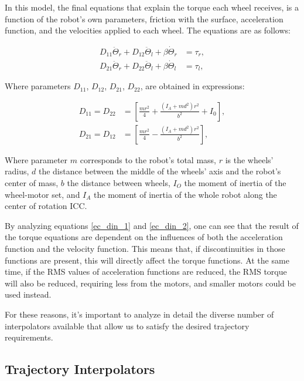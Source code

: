 \documentclass[a4paper]{aadeca}
\begin{document}
In this model, the final equations that explain the torque each wheel receives, is a function of the robot's own parameters, friction with the surface, acceleration function, and the velocities applied to each wheel.
The equations are as follows:

\begin{align}
D_{11}\ddot{\Theta}_r+D_{12}\ddot{\Theta}_l+\beta\dot{\Theta}_r&=\tau_r,
\label{ec_din_1}\\
D_{21}\ddot{\Theta}_r+D_{22}\ddot{\Theta}_l+\beta\dot{\Theta}_l&=\tau_l,
\label{ec_din_2}
\end{align}

Where parameters $D_{11}$, $D_{12}$, $D_{21}$, $D_{22}$, are obtained in expressions:

\begin{align}
D_{11}=D_{22}&=\left[\frac{mr^2}{4}+\frac{\left(I_A + md^2\right)r^2}{b^2}+I_0\right],\\
D_{21}=D_{12}&=\left[\frac{mr^2}{4}-\frac{\left(I_A + md^2\right)r^2}{b^2}\right],
\end{align}

Where parameter $m$ corresponds to the robot's total mass, $r$ is the wheels' radius, $d$ the distance between the middle of the wheels' axis and the robot's center of mass, $b$ the distance between wheels, $I_O$ the moment of inertia of the wheel-motor set, and $I_A$ the moment of inertia of the whole robot along the center of rotation ICC.

By analyzing equations \ref{ec_din_1} and \ref{ec_din_2}, one can see that the result of the torque equations are dependent on the influences of both the acceleration function and the velocity function.
This means that, if discontinuities in those functions are present, this will directly affect the torque functions.
At the same time, if the RMS values of acceleration functions are reduced, the RMS torque will also be reduced, requiring less from the motors, and smaller motors could be used instead.

For these reasons, it's important to analyze in detail the diverse number of interpolators available that allow us to satisfy the desired trajectory requirements.

\subsection{Trajectory Interpolators}
\end{document}
